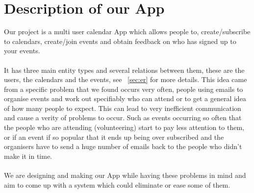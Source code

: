 \documentclass[11pt,a4paper]{article}
\begin{document}
\section{Description of our App}
Our project is a multi user calendar App which allows people to, create/subscribe to calendars, create/join events and obtain feedback on who has signed up to your events. 
\\
\\
\noindent
It has three main entity types and several relations between them, these are the users, the calendars and the events, see ~\cref{sec:er} for more details. This idea came from a specific problem that we found occurs very often, people using emails to organise events and work out specifiably who can attend or to get a general idea of how many people to expect. This can lead to very inefficient communication and cause a verity of problems to occur. Such as events occurring so often that the people who are attending (volunteering) start to pay less attention to them, or if an event if so popular that it ends up being over subscribed and the organisers have to send a huge number of emails back to the people who didn't make it in time.
\\
\\
\noindent
We are designing and making our App while having these problems in mind and aim to come up with a system which could eliminate or ease some of them. 
\end{document}
